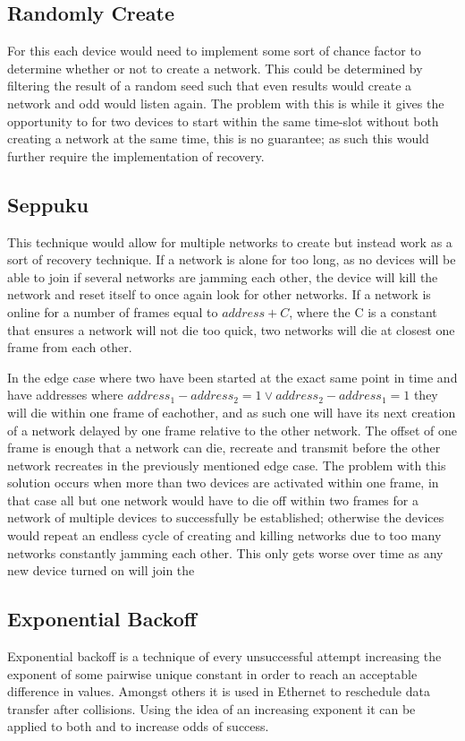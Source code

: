 \subsection{Randomly Create}\label{RCreate}
For this each device would need to implement some sort of chance factor to determine whether or not to create a network.
This could be determined by filtering the result of a random seed such that even results would create a network and odd would listen again.
The problem with this is while it gives the opportunity to for two devices to start within the same time-slot without both creating a network at the same time, this is no guarantee; as such this would further require the implementation of recovery.

\subsection{Seppuku}\label{KtN}
This technique would allow for multiple networks to create but instead work as a sort of recovery technique.
If a network is alone for too long, as no devices will be able to join if several networks are jamming each other, the device will kill the network and reset itself to once again look for other networks.
If a network is online for a number of frames equal to $address + C$, where the C is a constant that ensures a network will not die too quick, two networks will die at closest one frame from each other.

\bigskip \noindent
In the edge case where two have been started at the exact same point in time and have addresses where $address_1 - address_2 = 1 \lor address_2 - address_1 = 1$ they will die within one frame of eachother, and as such one will have its next creation of a network delayed by one frame relative to the other network.
The offset of one frame is enough that a network can die, recreate and transmit before the other network recreates in the previously mentioned edge case.
The problem with this solution occurs when more than two devices are activated within one frame, in that case all but one network would have to die off within two frames for a network of multiple devices to successfully be established; otherwise the devices would repeat an endless cycle of creating and killing networks due to too many networks constantly jamming each other.
This only gets worse over time as any new device turned on will join the

\subsection{Exponential Backoff}
Exponential backoff is a technique of every unsuccessful attempt increasing the exponent of some pairwise unique constant in order to reach an acceptable difference in values.
Amongst others it is used in Ethernet to reschedule data transfer after collisions. \citep{Ebackoff}
Using the idea of an increasing exponent it can be applied to both  and  to increase odds of success.
